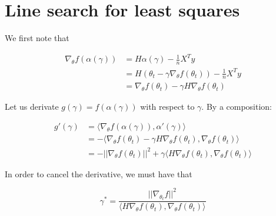 \documentclass[
10pt, %
a4paper, %
oneside, %
headinclude,footinclude, %
BCOR5mm, %
]{scrartcl}
\title{\normalfont{FTML practical session 6}}
\author{\spacedlowsmallcaps{}
}
\date{\today}
\begin{document}
\renewcommand{\sectionmark}[1]{\markright{\spacedlowsmallcaps{#1}}}
\lehead{\mbox{\llap{\small\thepage\kern1em\color{halfgray} \vline}\color{halfgray}\hspace{0.5em}\rightmark\hfil}} 
\pagestyle{scrheadings}
\maketitle 
\setcounter{tocdepth}{3} 

\section{\large\color{Blue}Line search for least squares}

We first note that 

\begin{equation}
    \begin{aligned}
        \label{eq:1}
	\nabla_{\theta}f(\alpha( \gamma)) &= H \alpha( \gamma) - \frac{1}{n} X^Ty\\
	&= H (\theta_{t}- \gamma \nabla_{ \theta}f(\theta_t)) - \frac{1}{n} X^Ty\\
	&= \nabla_{\theta}f(\theta_{t})- \gamma H \nabla_{\theta}f(\theta_{t})
    \end{aligned}
\end{equation}

Let us derivate $g(\gamma)=f(\alpha(\gamma))$ with respect to $\gamma$. By a composition:

\begin{equation}
    \label{eq:calcgrad}
    \begin{aligned}
	g'( \gamma) &= \langle\nabla_{\theta}f(\alpha(\gamma)),  \alpha'( \gamma) \rangle\\
	&= - \langle \nabla_{\theta}f(\theta_{t})- \gamma H \nabla_{\theta}f(\theta_t),\nabla_{\theta}f(\theta_{t}) \rangle\\
	&= - || \nabla_{ \theta}f(\theta_t) ||^2+ \gamma\langle H \nabla_{ \theta}f(\theta_t), \nabla_{ \theta}f(\theta_t)\rangle
    \end{aligned}
\end{equation}

In order to cancel the derivative, we must have that

\begin{equation}
    \gamma^* = \frac{|| \nabla_{ \theta_{t}}f ||^2}{\langle H \nabla_{\theta}f(\theta_t), \nabla_{\theta}f(\theta_t)\rangle} 
\end{equation}
\end{document}
